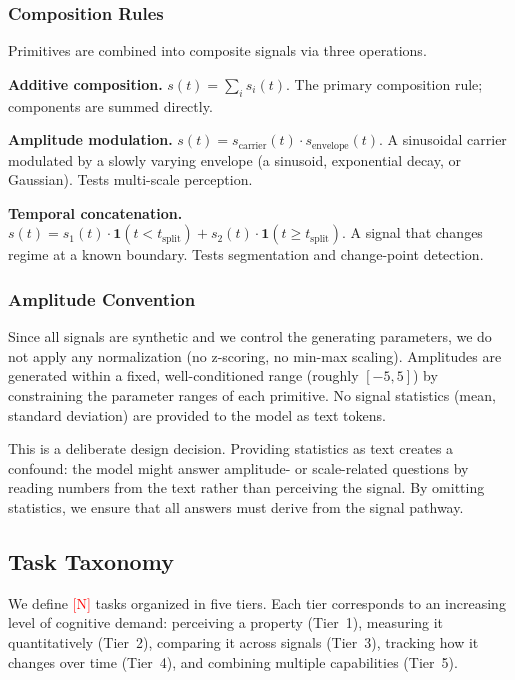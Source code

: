\documentclass[11pt]{article}
\newcommand{\placeholder}[1]{\textcolor{red}{[#1]}}
\begin{document}
\subsubsection{Composition Rules}

Primitives are combined into composite signals via three operations.

\textbf{Additive composition.} $s(t) = \sum_i s_i(t)$. The primary composition rule; components are summed directly.

\textbf{Amplitude modulation.} $s(t) = s_\text{carrier}(t) \cdot s_\text{envelope}(t)$. A sinusoidal carrier modulated by a slowly varying envelope (a sinusoid, exponential decay, or Gaussian). Tests multi-scale perception.

\textbf{Temporal concatenation.} $s(t) = s_1(t)\cdot\mathbf{1}(t < t_\text{split}) + s_2(t)\cdot\mathbf{1}(t \geq t_\text{split})$. A signal that changes regime at a known boundary. Tests segmentation and change-point detection.

\subsubsection{Amplitude Convention}

Since all signals are synthetic and we control the generating parameters, we do not apply any normalization (no z-scoring, no min-max scaling). Amplitudes are generated within a fixed, well-conditioned range (roughly $[-5, 5]$) by constraining the parameter ranges of each primitive. No signal statistics (mean, standard deviation) are provided to the model as text tokens.

This is a deliberate design decision. Providing statistics as text creates a confound: the model might answer amplitude- or scale-related questions by reading numbers from the text rather than perceiving the signal. By omitting statistics, we ensure that all answers must derive from the signal pathway.


\subsection{Task Taxonomy}
\label{sec:tasks}

We define \placeholder{N} tasks organized in five tiers. Each tier corresponds to an increasing level of cognitive demand: perceiving a property (Tier~1), measuring it quantitatively (Tier~2), comparing it across signals (Tier~3), tracking how it changes over time (Tier~4), and combining multiple capabilities (Tier~5).
\end{document}
